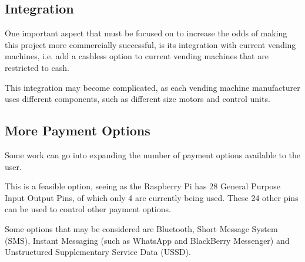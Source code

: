 \subsection{Integration}

One important aspect that must be focused on to increase the odds of making this project
more commercially successful, is its integration with current vending machines, i.e. add a
cashless option to current vending machines that are restricted to cash.

This integration may become complicated, as each vending machine manufacturer uses
different components, such as different size motors and control units. 

\subsection{More Payment Options}

Some work can go into expanding the number of payment options available to the user.

This is a feasible option, seeing as the Raspberry Pi has 28 General Purpose Input Output
Pins, of which only 4 are currently being used. These 24 other pins can be used to control
other payment options.

Some options that may be considered are Bluetooth, Short Message System (SMS), Instant
Messaging (such as WhatsApp and BlackBerry Messenger) and Unstructured Supplementary
Service Data (USSD).

